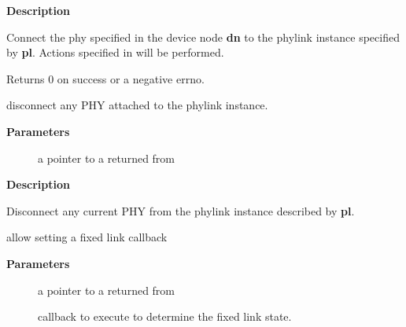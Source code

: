 \documentclass[a4paper,8pt,english]{sphinxmanual}
\begin{document}
\textbf{Description}

Connect the phy specified in the device node \textbf{dn} to the phylink instance
specified by \textbf{pl}. Actions specified in {\hyperref[networking/kapi:c.phylink_connect_phy]{\emph{}}} will be
performed.

Returns 0 on success or a negative errno.

\begin{fulllineitems}
\label{networking/kapi:c.phylink_disconnect_phy}
disconnect any PHY attached to the phylink instance.

\end{fulllineitems}


\textbf{Parameters}
\begin{description}
\item[{}] \leavevmode
a pointer to a {\hyperref[networking/kapi:c.phylink]{\emph{}}} returned from {\hyperref[networking/kapi:c.phylink_create]{\emph{}}}

\end{description}

\textbf{Description}

Disconnect any current PHY from the phylink instance described by \textbf{pl}.

\begin{fulllineitems}
\label{networking/kapi:c.phylink_fixed_state_cb}
allow setting a fixed link callback

\end{fulllineitems}


\textbf{Parameters}
\begin{description}
\item[{}] \leavevmode
a pointer to a {\hyperref[networking/kapi:c.phylink]{\emph{}}} returned from {\hyperref[networking/kapi:c.phylink_create]{\emph{}}}

\item[{}] \leavevmode
callback to execute to determine the fixed link state.

\end{description}
\end{document}
